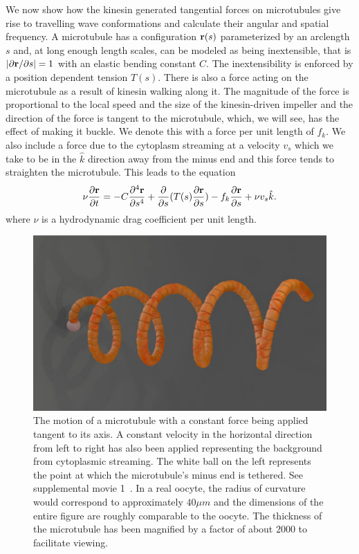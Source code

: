 \documentclass[pre,showpacs]{revtex4}
\def\br{{\bf r}}
\begin{document}
We now show how the kinesin generated tangential forces on microtubules give rise to travelling wave conformations 
and calculate their angular and spatial frequency.
A microtubule has a configuration $\br(s)$ parameterized by 
an arclength $s$ and, at long enough length scales, can be modeled as being inextensible, 
that is $|\partial \br/\partial s| = 1$
with an elastic bending constant $C$. The inextensibility is enforced by a position dependent tension $T(s)$. 
There is also a force acting on the microtubule as a result of kinesin walking along it.
The magnitude of the force is proportional to the local speed and the size of the kinesin-driven impeller
and the direction of the force is tangent to the microtubule,
which, we will see, has the effect of making it buckle. We denote this with a force per unit length of $f_k$. 
We also include a force due to the cytoplasm streaming at a velocity $v_s$ which
we take to be in the $\hat k$ direction away from the minus end and this force tends to straighten the microtubule. This leads to the equation
\begin{equation}
\label{eq:microtubule}
\nu \frac{\partial \br}{\partial t} =  -C \frac{\partial^4 \br}{\partial s^4} + \frac{\partial}{\partial s}(T(s)\frac{\partial \br}{\partial s}) -
f_k \frac{\partial \br}{\partial s} + \nu v_{s}{\hat k} .
\end{equation}
where $\nu$ is a hydrodynamic drag coefficient per unit length. 

\begin{figure}[htp]
\begin{center}
\includegraphics[width=\hsize]{simulation1.eps}
\caption{ 
The motion of a microtubule with a constant force being applied tangent to its axis. 
A constant velocity in the horizontal direction  from left to right has also been applied representing
the background from cytoplasmic streaming. The white ball on the left represents
the point at which the microtubule's minus end is tethered. See supplemental
movie 1~\cite{SupplMovies}. In a real oocyte, the radius of curvature would
correspond to approximately $40 \mu m$ and the dimensions of the entire figure are
roughly comparable to the oocyte. The thickness of the microtubule has been magnified
by a factor of about $2000$ to facilitate viewing.
}
\label{fig:simulation}
\end{center}
\end{figure}
\end{document}

